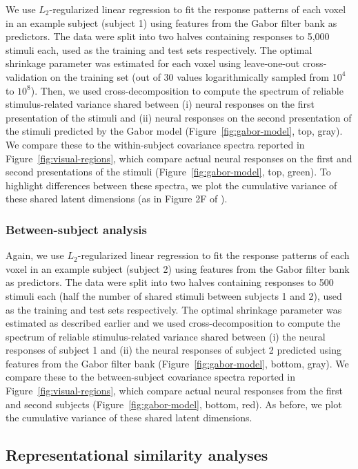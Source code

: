 \documentclass[10pt]{article}
\begin{document}
We use \(L_2\)-regularized linear regression to fit the response patterns of each voxel in an example subject (subject 1) using features from the Gabor filter bank as predictors. The data were split into two halves containing responses to 5,000 stimuli each, used as the training and test sets respectively. The optimal shrinkage parameter was estimated for each voxel using leave-one-out cross-validation on the training set (out of 30 values logarithmically sampled from \(10^4\) to \(10^8\)). Then, we used cross-decomposition to compute the spectrum of reliable stimulus-related variance shared between (i) neural responses on the first presentation of the stimuli and (ii) neural responses on the second presentation of the stimuli predicted by the Gabor model (Figure~\ref{fig:gabor-model}, top, gray). We compare these to the within-subject covariance spectra reported in Figure~\ref{fig:visual-regions}, which compare actual neural responses on the first and second presentations of the stimuli (Figure~\ref{fig:gabor-model}, top, green). To highlight differences between these spectra, we plot the cumulative variance of these shared latent dimensions (as in Figure 2F of \textcite{Stringer2019}).

\subsubsection{Between-subject analysis}\label{between-subject-analysis}

Again, we use \(L_2\)-regularized linear regression to fit the response patterns of each voxel in an example subject (subject 2) using features from the Gabor filter bank as predictors. The data were split into two halves containing responses to 500 stimuli each (half the number of shared stimuli between subjects 1 and 2), used as the training and test sets respectively. The optimal shrinkage parameter was estimated as described earlier and we used cross-decomposition to compute the spectrum of reliable stimulus-related variance shared between (i) the neural responses of subject 1 and (ii) the neural responses of subject 2 predicted using features from the Gabor filter bank (Figure~\ref{fig:gabor-model}, bottom, gray). We compare these to the between-subject covariance spectra reported in Figure~\ref{fig:visual-regions}, which compare actual neural responses from the first and second subjects (Figure~\ref{fig:gabor-model}, bottom, red). As before, we plot the cumulative variance of these shared latent dimensions.

\subsection{Representational similarity analyses}\label{representational-similarity-analyses}
\end{document}
